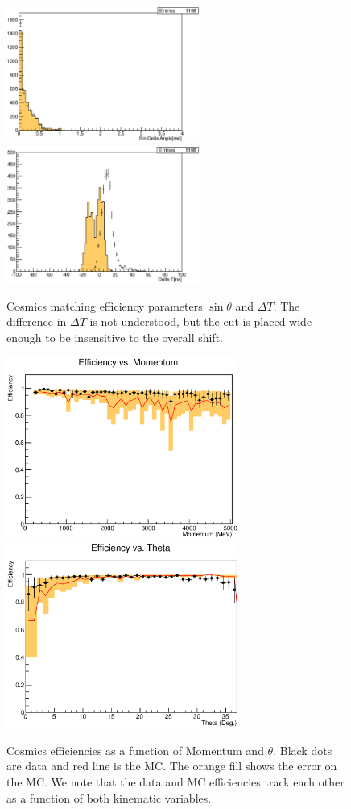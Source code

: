 \begin{figure}
\centering
\includegraphics[width=2.5in]{Figures/Systematics/MatchingEfficiency/dScosmics.eps}
\includegraphics[width=2.5in]{Figures/Systematics/MatchingEfficiency/dTcosmics.eps}
\caption{Cosmics matching efficiency parameters \(\sin \theta\) and \(\Delta T\). The difference in \(\Delta T\) is not understood, but the cut is placed wide enough to be insensitive to the overall shift.}
\label{fig:eff_dSdT}
\end{figure}

\begin{figure}
\centering
\includegraphics[width=3in]{Figures/Systematics/MatchingEfficiency/Eff_vs_Momentum.eps}
\includegraphics[width=3in]{Figures/Systematics/MatchingEfficiency/Eff_vs_Theta.eps}
\caption{Cosmics efficiencies as a function of Momentum and \(\theta\). Black dots are data and red line is the MC. The orange fill shows the error on the MC. We note that the data and MC efficiencies track each other as a function of both kinematic variables.}
\label{fig:eff_ND}
\end{figure}

